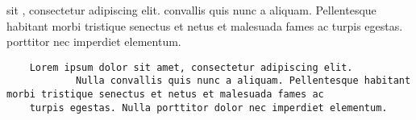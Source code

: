\documentclass{book}
\begin{document}
\begin{something}
	   sit , consectetur adipiscing elit.
	 convallis quis nunc a aliquam. Pellentesque habitant
	morbi tristique senectus et netus et malesuada fames ac
	turpis egestas.  porttitor  nec imperdiet elementum.
\end{something}

\begin{verbatim}
    Lorem ipsum dolor sit amet, consectetur adipiscing elit. 
            Nulla convallis quis nunc a aliquam. Pellentesque habitant 
morbi tristique senectus et netus et malesuada fames ac 
    turpis egestas. Nulla porttitor dolor nec imperdiet elementum. 
\end{verbatim}
\end{document}
